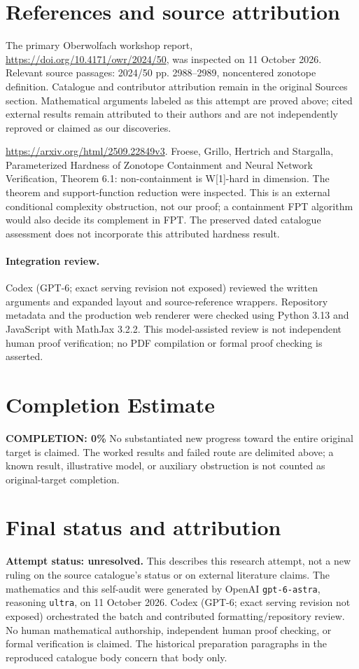 \documentclass[11pt]{article}
\begin{document}
\section{References and source attribution}
The primary Oberwolfach workshop report, \url{https://doi.org/10.4171/owr/2024/50}, was inspected on 11 October 2026. Relevant source passages: 2024/50 pp. 2988--2989, noncentered zonotope definition. Catalogue and contributor attribution remain in the original Sources section. Mathematical arguments labeled as this attempt are proved above; cited external results remain attributed to their authors and are not independently reproved or claimed as our discoveries.

\url{https://arxiv.org/html/2509.22849v3}. Froese, Grillo, Hertrich and Stargalla, Parameterized Hardness of Zonotope Containment and Neural Network Verification, Theorem 6.1: non-containment is W[1]-hard in dimension. The theorem and support-function reduction were inspected. This is an external conditional complexity obstruction, not our proof; a containment FPT algorithm would also decide its complement in FPT. The preserved dated catalogue assessment does not incorporate this attributed hardness result.


\paragraph{Integration review.} Codex (GPT-6; exact serving revision not exposed) reviewed the written arguments and expanded layout and source-reference wrappers. Repository metadata and the production web renderer were checked using Python 3.13 and JavaScript with MathJax 3.2.2. This model-assisted review is not independent human proof verification; no PDF compilation or formal proof checking is asserted.

\section{Completion Estimate}
\noindent\textbf{COMPLETION: 0\%}
No substantiated new progress toward the entire original target is claimed. The worked results and failed route are delimited above; a known result, illustrative model, or auxiliary obstruction is not counted as original-target completion.

\section{Final status and attribution}
\textbf{Attempt status: unresolved.} This describes this research attempt, not a new ruling on the source catalogue's status or on external literature claims.
The mathematics and this self-audit were generated by OpenAI \texttt{gpt-6-astra}, reasoning \texttt{ultra}, on 11 October 2026. Codex (GPT-6; exact serving revision not exposed) orchestrated the batch and contributed formatting/repository review. No human mathematical authorship, independent human proof checking, or formal verification is claimed. The historical preparation paragraphs in the reproduced catalogue body concern that body only.
\end{document}
